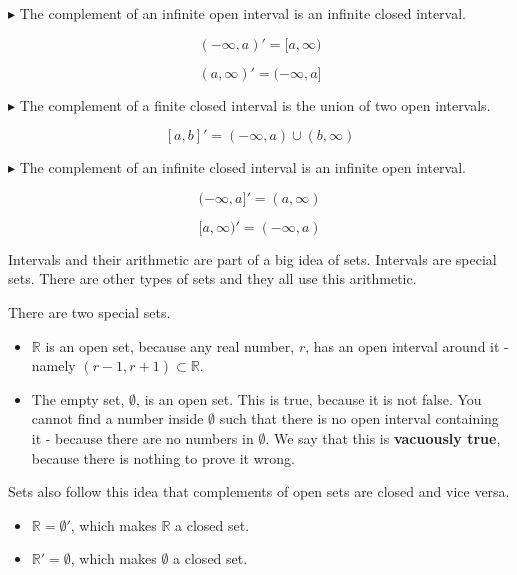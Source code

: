 \documentclass{ximera}
\begin{document}
$\blacktriangleright$ The complement of an infinite open interval is an infinite closed interval.

\[     (-\infty, a)' = [a, \infty)          \]

\[     (a, \infty)' = (-\infty, a]          \]



$\blacktriangleright$ The complement of a finite closed interval is the union of two open intervals.

\[    [a,b]'  = (-\infty, a) \cup (b, \infty)          \]



$\blacktriangleright$ The complement of an infinite closed interval is an infinite open interval.

\[     (-\infty, a]' = (a, \infty)          \]

\[     [a, \infty)' = (-\infty, a)          \]









Intervals and their arithmetic are part of a big idea of sets.  Intervals are special sets.  There are other types of sets and they all use this arithmetic.

There are two special sets.

\begin{itemize}
\item $\mathbb{R}$  is an open set, because any real number, $r$, has an open interval around it - namely $(r-1, r+1) \subset \mathbb{R}$.
\item The empty set, $\emptyset$, is an open set.  This is true, because it is not false.  You cannot find a number inside $\emptyset$ such that there is no open interval containing it - because there are no numbers in $\emptyset$.  We say that this is \textbf{vacuously true}, because there is nothing to prove it wrong.
\end{itemize}





Sets also follow this idea that complements of open sets are closed and vice versa.

\begin{itemize}
\item $\mathbb{R} = \emptyset'$, which makes $\mathbb{R}$ a closed set.
\item $\mathbb{R}' = \emptyset$, which makes $\emptyset$ a closed set.
\end{itemize}
\end{document}
